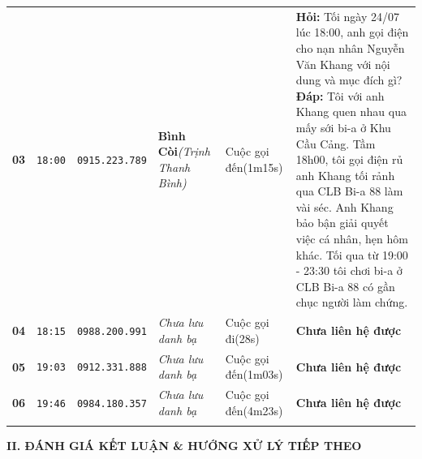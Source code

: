 \documentclass[12pt,a4paper]{article}
\begin{document}
\begin{xltabular}{\textwidth}{C{0.7cm} C{1.2cm} C{2.2cm} L{2.2cm} C{2.0cm} >{\raggedright\arraybackslash}X}
\textbf{03} & \texttt{18:00} & \texttt{0915.223.789} & \textbf{Bình Còi}\newline \textit{(Trịnh Thanh Bình)} & Cuộc gọi đến\newline (1m15s) & \textbf{Hỏi:} Tối ngày 24/07 lúc 18:00, anh gọi điện cho nạn nhân Nguyễn Văn Khang với nội dung và mục đích gì?\newline \textbf{Đáp:} Tôi với anh Khang quen nhau qua mấy sới bi-a ở Khu Cầu Cảng. Tầm 18h00, tôi gọi điện rủ anh Khang tối rảnh qua CLB Bi-a 88 làm vài séc. Anh Khang bảo bận giải quyết việc cá nhân, hẹn hôm khác. Tối qua từ 19:00 - 23:30 tôi chơi bi-a ở CLB Bi-a 88 có gần chục người làm chứng. \\ \addlinespace[4pt]
\textbf{04} & \texttt{18:15} & \texttt{0988.200.991} & \textit{Chưa lưu danh bạ} & Cuộc gọi đi\newline (28s) & \textbf{Chưa liên hệ được} \\ \addlinespace[4pt]
\textbf{05} & \texttt{19:03} & \texttt{0912.331.888} & \textit{Chưa lưu danh bạ} & Cuộc gọi đến\newline (1m03s) & \textbf{Chưa liên hệ được} \\ \addlinespace[4pt]
\textbf{06} & \texttt{19:46} & \texttt{0984.180.357} & \textit{Chưa lưu danh bạ} & Cuộc gọi đến\newline (4m23s) & \textbf{Chưa liên hệ được} \\ \addlinespace[4pt]
\end{xltabular}
\endgroup

\vspace{0.2cm}


\vspace{0.3cm}\noindent\textbf{\large II. ĐÁNH GIÁ KẾT LUẬN \& HƯỚNG XỬ LÝ TIẾP THEO}\\[0.15cm]
\end{document}
